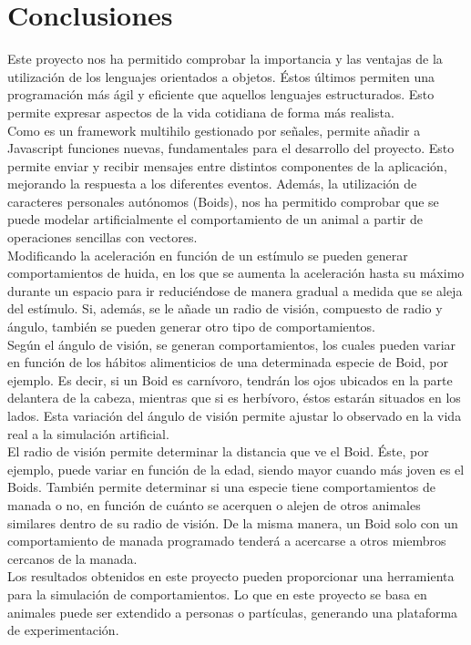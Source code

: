 \section{Conclusiones}
\label{chap:conclusiones}

Este proyecto nos ha permitido comprobar la importancia y las ventajas de la utilización de los lenguajes orientados a objetos. 
Éstos últimos permiten una programación más ágil y eficiente que aquellos lenguajes estructurados. Esto permite expresar aspectos de la vida 
cotidiana de forma más realista.\\

Como \lluvia es un framework multihilo gestionado por señales, permite añadir a Javascript funciones nuevas, fundamentales para el desarrollo del proyecto. 
Esto permite enviar y recibir mensajes entre distintos componentes de la aplicación, mejorando la respuesta a los diferentes eventos. Además, la utilización de caracteres 
personales autónomos (Boids), nos ha permitido comprobar que se puede modelar artificialmente el comportamiento de un animal a partir de 
operaciones sencillas con vectores.\\

Modificando la aceleración en función de un estímulo se pueden generar comportamientos de huida, en los que se aumenta la aceleración hasta su 
máximo durante un espacio para ir reduciéndose de manera gradual a medida que se aleja del estímulo.
Si, además, se le añade un radio de visión, compuesto de radio y ángulo, también se pueden generar otro tipo de comportamientos.\\

Según el ángulo de visión, se generan comportamientos, los cuales pueden variar en función de los hábitos alimenticios de 
una determinada especie de Boid, por ejemplo. Es decir, si un Boid es carnívoro, tendrán los ojos ubicados en la parte delantera de la cabeza, mientras 
que si es herbívoro, éstos estarán situados en los lados. Esta variación del ángulo de visión permite ajustar lo observado en la vida real a la 
simulación artificial.\\

El radio de visión permite determinar la distancia que ve el Boid. Éste, por ejemplo, puede variar en función de la edad, siendo mayor cuando
más joven es el Boids. También permite determinar si una especie tiene comportamientos de manada o no, en función de cuánto se acerquen o alejen de 
otros animales similares dentro de su radio de visión. De la misma manera, un Boid solo con un comportamiento de manada programado tenderá a 
acercarse a otros miembros cercanos de la manada.\\


Los resultados obtenidos en este proyecto pueden proporcionar una herramienta para la simulación de comportamientos. Lo que en este proyecto 
se basa en animales puede ser extendido a personas o partículas, generando una plataforma de experimentación.